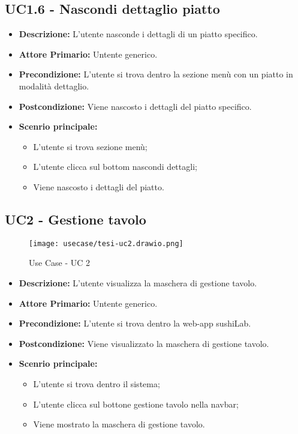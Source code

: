 \subsection{UC1.6 - Nascondi dettaglio piatto}
\begin{itemize}
    \item \textbf{Descrizione:} L'utente nasconde i dettagli di un piatto specifico.
    \item \textbf{Attore Primario:} Untente generico.
    \item \textbf{Precondizione:} L'utente si trova dentro la sezione menù con un piatto in modalità dettaglio.
    \item \textbf{Postcondizione:} Viene nascosto i dettagli del piatto specifico.
    \item \textbf{Scenrio principale:}  
    \begin{itemize}
        \item L'utente si trova sezione menù;
        \item L'utente clicca sul bottom nascondi dettagli;
        \item Viene nascosto i dettagli del piatto.
    \end{itemize}
\end{itemize}
\subsection{UC2 - Gestione tavolo}
\begin{figure}[H]
    \centering
    \texttt{[image: usecase/tesi-uc2.drawio.png]}
    \caption{Use Case - UC 2}
\end{figure}
\begin{itemize}
    \item \textbf{Descrizione:} L'utente visualizza la maschera di gestione tavolo.
    \item \textbf{Attore Primario:} Untente generico.
    \item \textbf{Precondizione:} L'utente si trova dentro la web-app sushiLab.
    \item \textbf{Postcondizione:} Viene visualizzato la maschera di gestione tavolo.
    \item \textbf{Scenrio principale:}
    \begin{itemize}
        \item L'utente si trova dentro il sistema;
        \item L'utente clicca sul bottone gestione tavolo nella navbar;
        \item Viene mostrato la maschera di gestione tavolo.
    \end{itemize}
\end{itemize}
